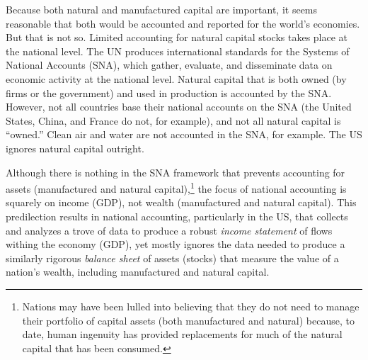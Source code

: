 Because both natural and manufactured capital are important, 
it seems reasonable that both would be accounted and reported for the world's economies.
But that is not so.
Limited accounting for natural capital stocks takes place at the national level. 
The UN produces international standards for the 
Systems of National Accounts (SNA), which gather, evaluate, 
and disseminate data on economic activity at the national level. 
Natural capital that is both owned (by firms or the government) and used in production
is accounted by the SNA. 
However, not all countries base their national accounts on the SNA 
(the United States, China, and France do not, for example), 
and not all natural capital is ``owned.'' 
Clean air and water are not accounted in the SNA, for example. 
The US ignores natural capital outright.


Although there is nothing in the SNA framework that prevents 
accounting for assets (manufactured and natural capital),\footnote{Nations 
	may have been lulled into believing that they 
	do not need to manage their portfolio of capital assets 
	(both manufactured and natural)
	because, to date, human ingenuity has provided replacements for much of the
	natural capital that has been consumed.}
the focus of national accounting is squarely on income (GDP), 
not wealth (manufactured and natural capital).\cite[p.~415]{UNSNA2008}  
This predilection results in national accounting,
particularly in the US, that collects and analyzes a trove of data to
produce a robust \emph{income statement} of flows withing the economy (GDP),
yet mostly ignores the data needed to produce a similarly rigorous
\emph{balance sheet} of assets (stocks) that measure the value 
of a nation's wealth, including manufactured and natural capital.

